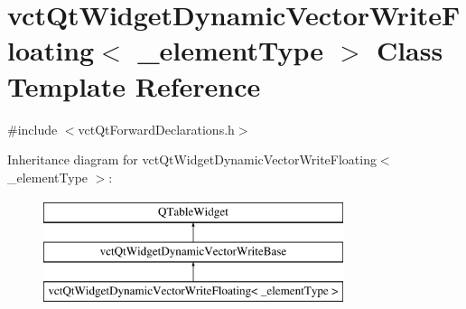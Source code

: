 \hypertarget{classvct_qt_widget_dynamic_vector_write_floating}{}\section{vct\+Qt\+Widget\+Dynamic\+Vector\+Write\+Floating$<$ \+\_\+element\+Type $>$ Class Template Reference}
\label{classvct_qt_widget_dynamic_vector_write_floating}


{\ttfamily \#include $<$vct\+Qt\+Forward\+Declarations.\+h$>$}

Inheritance diagram for vct\+Qt\+Widget\+Dynamic\+Vector\+Write\+Floating$<$ \+\_\+element\+Type $>$\+:\begin{figure}[H]
\begin{center}
\leavevmode
\includegraphics[height=3.000000cm]{d1/da5/classvct_qt_widget_dynamic_vector_write_floating}
\end{center}
\end{figure}
